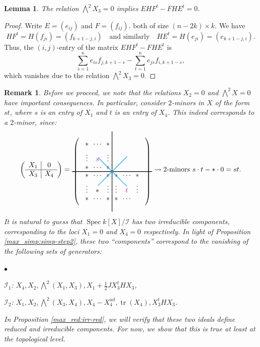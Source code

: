 \documentclass[pdflatex,sn-mathphys-num]{sn-jnl}%
\theoremstyle{thmstyleone}%
\newtheorem{lemma}[subsubsection]{Lemma}%
\theoremstyle{thmstyletwo}%
\newtheorem{remark}[subsubsection]{Remark}%
\numberwithin{equation}{subsection}
\theoremstyle{thmstylethree}%
\newcommand{\CI}{\ensuremath{\mathcal{I}}\xspace}
\newcommand{\ad}{\mathrm{ad}}
\DeclareMathOperator{\Spec}{Spec}
\DeclareMathOperator{\tr}{tr}
\newenvironment{altitemize}
	{\begin{list}
			{$\bullet$}
			{\setlength{\labelwidth}{0pt}
				\setlength{\itemindent}{5pt}
				\setlength{\labelsep}{5pt}
				\setlength{\leftmargin}{0pt}
				\setlength{\itemsep}{\the\smallskipamount}
		}}
		{\end{list}}
\begin{document}
\begin{lemma}\label{max_simp:simp-step2-ideal-generator-lem}
The relation $\bigwedge^2 X_3=0$ implies $EHF^t-FHE^t=0$.
\end{lemma}
\begin{proof}
Write $E=(e_{ij})$ and $F=(f_{ij})$. both of size $(n-2k)\times k$. 
We have
$$
HF^{t}=H(f_{ji})=(f_{k+1-j,i})\quad\text{and similarly}\quad HE^{t}=H(e_{ji})=(e_{k+1-j,i}).
$$
Thus, the $(i,j)$-entry of the matrix $EHF^t-FHE^t$ is
\begin{equation*}
	\sum_{s=1}^\kappa e_{is}f_{j,k+1-s} - \sum_{t=1}^\kappa e_{js}f_{i,k+1-s},
\end{equation*}
which vanishes due to the relation $\bigwedge^2 X_3=0$.
\end{proof}
		
\begin{remark}\label{max_simp:simp-step2_comp}
Before we proceed, we note that the relations $X_2=0$ and $\bigwedge^2 X=0$ have important consequences. 
In particular, consider $2$-minors in $X$ of the form $st$, where $s$ is an entry of $X_1$ and $t$ is an entry of $X_4$. This indeed corresponds to a $2$-minor, since:
\begin{equation*}
    \left(\begin{array}{c|c}
		X_1&0\\
		\hline
		X_3&X_4
	\end{array}\right)=
	\begin{tikzpicture}[>=stealth,thick,baseline]
		\matrix [matrix of math nodes,left delimiter=(,right delimiter=)](A){ 
		*		&	\cdots	&	*		&			&			&			\\
		\vdots 	&	{\color{magenta}s}		&	\vdots 	&			&			&			\\
		*		&	\cdots	&	*		&			&			&			\\
		*		&	\cdots	&	*		&	*		&	\cdots	&	*		\\
		\vdots 	&	*		&	\vdots 	&	\vdots	&	{\color{magenta}t}		&	\vdots	\\
		*		&	\cdots	&	*		&	*		&	\cdots	&	\\					
		};
		\draw (-2,0) -- (2,0);
		\draw (0,-2) -- (0,2);
		\draw[cyan] (-0.7,0.7) -- (0.75,-0.75);
		\draw[cyan] (-0.7,-0.7) -- (0.75,0.75);
	\end{tikzpicture}\rightsquigarrow \text{2-minors } s\cdot t-*\cdot0=st.
\end{equation*}
It is natural to \emph{guess} that $\Spec k[X]/\CI$ has two irreducible components, corresponding to the loci $X_1=0$ and $X_4=0$ respectively.
In light of Proposition \ref{max_simp:simp-step2}, these two ``components'' correspond to the vanishing of the following sets of generators:
\begin{altitemize}
	\item $\CI_1$: $X_4, X_2, \bigwedge^2 (X_1,X_3), X_1+\frac{1}{2}JX_3^tHX_3$,
    \item $\CI_2$: $X_1,X_2,\bigwedge^2(X_3,X_4), X_4-X_4^{\ad},\tr(X_4),X_3^tHX_3$.
\end{altitemize}
In Proposition \ref{max_red:irr-red}, we will verify that these two ideals define reduced and irreducible components.
For now, we show that this is true at least at the topological level.
\end{remark}
\end{document}
